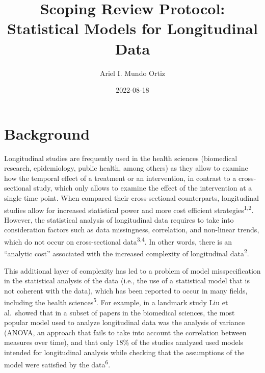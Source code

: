 \documentclass[
]{article}
\title{Scoping Review Protocol: Statistical Models for Longitudinal
Data}
\author{Ariel I. Mundo Ortiz}
\date{2022-08-18}
\renewcommand*\contentsname{Table of contents}
\newcommand\contentsname{Table of contents}
\begin{document}
\maketitle
\ifdefined\Shaded\renewenvironment{Shaded}{\begin{tcolorbox}[sharp corners, enhanced, breakable, boxrule=0pt, frame hidden, interior hidden, borderline west={3pt}{0pt}{shadecolor}]}{\end{tcolorbox}}\fi

\renewcommand*\contentsname{Table of contents}
{
\hypersetup{linkcolor=}
\setcounter{tocdepth}{3}
\tableofcontents
}
\hypertarget{background}{%
\section{Background}\label{background}}

Longitudinal studies are frequently used in the health sciences
(biomedical research, epidemiology, public health, among others) as they
allow to examine how the temporal effect of a treatment or an
intervention, in contrast to a cross-sectional study, which only allows
to examine the effect of the intervention at a single time point. When
compared their cross-sectional counterparts, longitudinal studies allow
for increased statistical power and more cost efficient
strategies\textsuperscript{1,2}. However, the statistical analysis of
longitudinal data requires to take into consideration factors such as
data missingness, correlation, and non-linear trends, which do not occur
on cross-sectional data\textsuperscript{3,4}. In other words, there is
an ``analytic cost'' associated with the increased complexity of
longitudinal data\textsuperscript{2}.

This additional layer of complexity has led to a problem of model
misspecification in the statistical analysis of the data (i.e., the use
of a statistical model that is not coherent with the data), which has
been reported to occur in many fields, including the health
sciences\textsuperscript{5}. For example, in a landmark study Liu et
al.~showed that in a subset of papers in the biomedical sciences, the
most popular model used to analyze longitudinal data was the analysis of
variance (ANOVA, an approach that fails to take into account the
correlation between measures over time), and that only 18\% of the
studies analyzed used models intended for longitudinal analysis while
checking that the assumptions of the model were satisfied by the
data\textsuperscript{6}.
\end{document}
